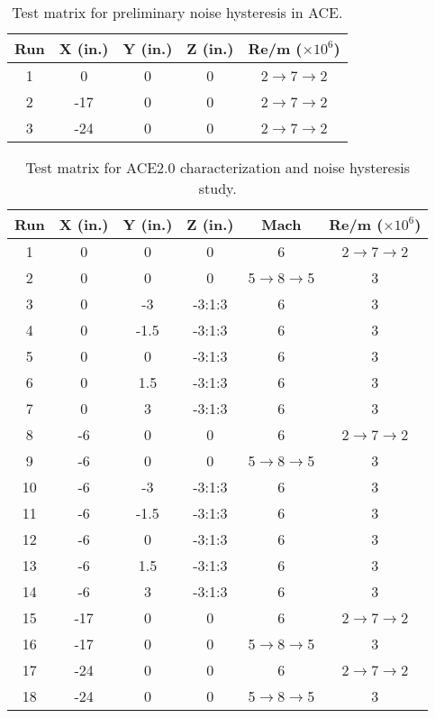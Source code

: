 \begin{table}[h]
    \centering
    \label{tab:ace-survey}
    \begin{tabular}{|c|c|c|c|c|}
        \hline
    \textbf{Run} & \textbf{X (in.)} & \textbf{Y (in.)} & \textbf{Z (in.)} & \textbf{Re/m ($\times10^6$)} \\ \hline
        1 & 0 & 0 & 0 & 2$\to$7$\to$2 \\ \hline
        2 & -17 & 0 & 0 & 2$\to$7$\to$2 \\ \hline
        3 & -24 & 0 & 0 & 2$\to$7$\to$2 \\ \hline
    \end{tabular}
    \caption{Test matrix for preliminary noise hysteresis in ACE.}
\end{table}

\begin{table}[h]
    \centering
    \label{tab:ace2-survey}
    \begin{tabular}{|c|c|c|c|c|c|}
        \hline
        \textbf{Run} & \textbf{X (in.)} & \textbf{Y (in.)} & \textbf{Z (in.)} & \textbf{Mach} & \textbf{Re/m ($\times10^6$)} \\ \hline
        1 & 0 & 0 & 0 & 6 & 2$\to$7$\to$2 \\ \hline
        2 & 0 & 0 & 0 & 5$\to$8$\to$5 & 3 \\ \hline
        3 & 0 & -3 & -3:1:3 & 6 & 3 \\ \hline
        4 & 0 & -1.5 & -3:1:3 & 6 & 3 \\ \hline
        5 & 0 & 0 & -3:1:3 & 6 & 3 \\ \hline
        6 & 0 & 1.5 & -3:1:3 & 6 & 3 \\ \hline
        7 & 0 & 3 & -3:1:3 & 6 & 3 \\ \hline
        8 & -6 & 0 & 0 & 6 & 2$\to$7$\to$2 \\ \hline
        9 & -6 & 0 & 0 & 5$\to$8$\to$5 & 3 \\ \hline
        10 & -6 & -3 & -3:1:3 & 6 & 3 \\ \hline
        11 & -6 & -1.5 & -3:1:3 & 6 & 3 \\ \hline
        12 & -6 & 0 & -3:1:3 & 6 & 3 \\ \hline
        13 & -6 & 1.5 & -3:1:3 & 6 & 3 \\ \hline
        14 & -6 & 3 & -3:1:3 & 6 & 3 \\ \hline
        15 & -17 & 0 & 0 & 6 & 2$\to$7$\to$2 \\ \hline
        16 & -17 & 0 & 0 & 5$\to$8$\to$5 & 3 \\ \hline
        17 & -24 & 0 & 0 & 6 & 2$\to$7$\to$2 \\ \hline
        18 & -24 & 0 & 0 & 5$\to$8$\to$5 & 3 \\ \hline
    \end{tabular}
    \caption{Test matrix for ACE2.0 characterization and noise hysteresis study.}
\end{table}


